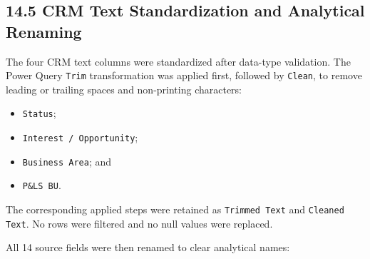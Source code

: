 \documentclass[11pt,a4paper]{article}
\begin{document}
\subsection{14.5 CRM Text Standardization and Analytical Renaming}

The four CRM text columns were standardized after data-type validation. The
Power Query \texttt{Trim} transformation was applied first, followed by
\texttt{Clean}, to remove leading or trailing spaces and non-printing
characters:

\begin{itemize}[leftmargin=7mm,itemsep=2pt]
    \item \texttt{Status};
    \item \texttt{Interest / Opportunity};
    \item \texttt{Business Area}; and
    \item \texttt{P\&LS BU}.
\end{itemize}

The corresponding applied steps were retained as \texttt{Trimmed Text} and
\texttt{Cleaned Text}. No rows were filtered and no null values were replaced.

All 14 source fields were then renamed to clear analytical names:
\end{document}
